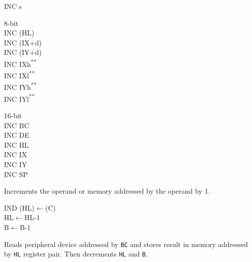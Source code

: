 \documentclass[12pt,twoside,openright,a4paper]{book}
\newcommand{\UNDOC}{\textnormal{\textsuperscript{**}}}
\begin{document}
\begin{basedescript}{
	\desclabelstyle{\multilinelabel}
	\desclabelwidth{3cm}}
\begin{detailitem}{INC s}
\begin{DetailVariants}
			\textnormal{8-bit}\\
			INC (HL)\\
			INC (IX+d)\\
			INC (IY+d)\\
			INC IXh\UNDOC\\
			INC IXl\UNDOC\\
			INC IYh\UNDOC\\
			INC IYl\UNDOC

			\textnormal{16-bit}\\
			INC BC\\
			INC DE\\
			INC HL\\
			INC IX\\
			INC IY\\
			INC SP
		\end{DetailVariants}

		Increments the operand or memory addressed by the operand by 1.

		\begin{DetailEffects}[v]
		\end{DetailEffects}
				
		\begin{DetailTiming}
		\end{DetailTiming}

	\end{detailitem}

 	\begin{detailitem}{IND}
		{(HL)$\leftarrow$(C)\\
		HL$\leftarrow$HL-1\\
		B$\leftarrow$B-1}

		Reads peripheral device addressed by {\tt BC} and stores result in memory addressed by {\tt HL} register pair. Then decrements {\tt HL} and {\tt B}.

		\begin{DetailEffects}
		\end{DetailEffects}
				

\end{detailitem}
\end{basedescript}
\end{document}
